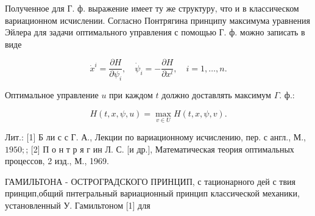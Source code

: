 \documentclass[10pt]{article}
\begin{document}
Полученное для Г. ф. выражение имеет ту же структуру, что и в классическом вариационном исчислении. Согласно Понтрягина принципу максимума уравнения Эйлера для задачи оптимального управления с помощью Г. ф. можно записать в виде



\[

\dot{x}^{i}=\frac{\partial H}{\partial \psi_{i}}, \quad \dot{\psi}_{i}=-\frac{\partial H}{\partial x^{l}}, \quad i=1, \ldots, n .

\]



Оптимальное управление $u$ при каждом $t$ должно доставлять максимум $\Gamma$. ф.:



\[

H(t, x, \psi, u)=\max _{v \in U} H(t, x, \psi, v) .

\]



Лит.: [1] Б ли с с Г. А., Лекции по вариационному исчислению, пер. с англ., М., $1950 ;$; [2] П о н т р я г ин Л. С. [и др.], Математическая теория оптимальных процессов, 2 изд., М., 1969.



ГАМИЛЬТОНА - ОСТРОГРАДСКОГО ПРИНЦИП, с тационарного дей с твия принцип,общий пнтегральный вариационный принцип классической механики, установленный У. Гамильтоном [1] для
\end{document}
